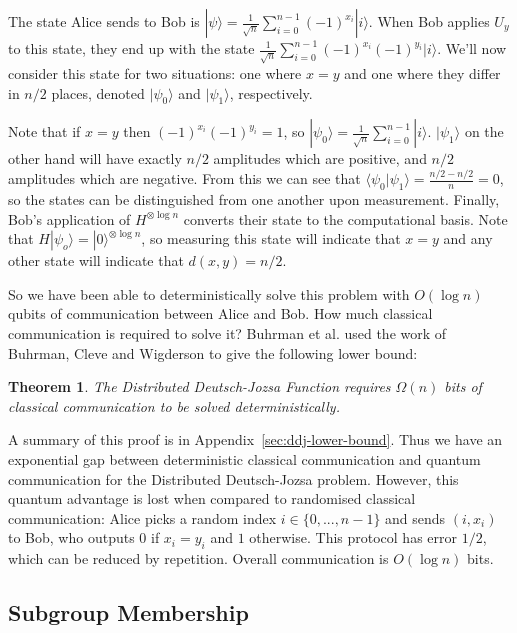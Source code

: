 \documentclass[a4paper]{article}
\newtheorem{theorem}{Theorem}[section]
\begin{document}
        The state Alice sends to Bob is $|\psi\rangle = \frac{1}{\sqrt{n}}\sum_{i=0}^{n-1} (-1)^{x_i}|i\rangle$. When Bob applies $U_y$ to this state, they end up with the state $\frac{1}{\sqrt{n}}\sum_{i=0}^{n-1}(-1)^{x_i}(-1)^{y_i}|i\rangle$. We'll now consider this state for two situations: one where $x = y$ and one where they differ in $n/2$ places, denoted $|\psi_0\rangle$ and $|\psi_1\rangle$, respectively.

        Note that if $x = y$ then $(-1)^{x_i}(-1)^{y_i} = 1$, so $|\psi_0\rangle = \frac{1}{\sqrt{n}}\sum_{i = 0}^{n-1}|i\rangle$. $|\psi_1\rangle$ on the other hand will have exactly $n/2$ amplitudes which are positive, and $n/2$ amplitudes which are negative. From this we can see that $\langle\psi_0|\psi_1\rangle = \frac{n/2 - n/2}{n} = 0$, so the states can be distinguished from one another upon measurement. Finally, Bob's application of $H^{\otimes \log n}$ converts their state to the computational basis. Note that $H|\psi_o\rangle = |0\rangle^{\otimes\log n}$, so measuring this state will indicate that $x = y$ and any other state will indicate that $d(x, y) = n/2$.

        So we have been able to deterministically solve this problem with $O(\log n)$ qubits of communication between Alice and Bob. How much classical communication is required to solve it? Buhrman et al.\cite{RevModPhys.82.665} used the work of Buhrman, Cleve and Wigderson \cite{Buhrman:1998:QVC:276698.276713} to give the following lower bound:

        \begin{theorem}
            \label{thm:ddj}
            The Distributed Deutsch-Jozsa Function requires $\Omega(n)$ bits of classical communication to be solved deterministically.
        \end{theorem}

        A summary of this proof is in Appendix~\ref{sec:ddj-lower-bound}. Thus we have an exponential gap between deterministic classical communication and quantum communication for the Distributed Deutsch-Jozsa problem. However, this quantum advantage is lost when compared to randomised classical communication: Alice picks a random index $i \in \{0,...,n-1\}$ and sends $(i, x_i)$ to Bob, who outputs $0$ if $x_i = y_i$ and $1$ otherwise. This protocol has error $1/2$, which can be reduced by repetition. Overall communication is $O(\log n)$ bits.

        \subsection{Subgroup Membership}
        \label{sec:subgroup-membership}
\end{document}
